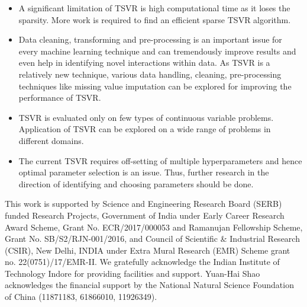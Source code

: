 \documentclass[pdflatex,sn-mathphys]{sn-jnl}%
\theoremstyle{thmstyleone}%
\theoremstyle{thmstyletwo}%
\theoremstyle{thmstylethree}%
\begin{document}
\begin{itemize}
\item
A significant limitation of TSVR is high computational time as it loses the sparsity. More work is required to find an efficient sparse TSVR algorithm.
\item
Data cleaning, transforming and pre-processing is an important issue for every machine learning technique and can tremendously improve results and even help in identifying novel interactions within data. As TSVR is a relatively new technique, various data handling, cleaning, pre-processing techniques like missing value imputation can be explored for improving the performance of TSVR.
\item
TSVR is evaluated only on few types of continuous variable problems. Application of TSVR can be explored on a wide range of problems in different domains.
\item
The current TSVR requires off-setting of multiple hyperparameters and hence optimal parameter selection is an issue. Thus, further research in the direction of identifying and choosing parameters should be done.

\end{itemize}


\backmatter

This work is supported by Science and Engineering Research Board (SERB) funded Research Projects, Government of India under Early Career Research Award Scheme, Grant No. ECR/2017/000053 and Ramanujan Fellowship Scheme, Grant No. SB/S2/RJN-001/2016, and Council of Scientific \& Industrial Research (CSIR), New Delhi, INDIA under Extra Mural Research (EMR) Scheme grant no. 22(0751)/17/EMR-II.  We gratefully acknowledge the Indian Institute of Technology Indore for providing facilities and support. Yuan-Hai Shao acknowledges the financial support by the National Natural Science Foundation of China (11871183, 61866010, 11926349).






\end{document}

